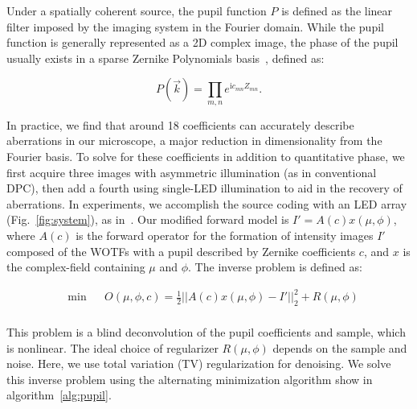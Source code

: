 Under a spatially coherent source, the pupil function $P$ is defined as the linear filter imposed by the imaging system in the Fourier domain. While the pupil function is generally represented as a 2D complex image, the phase of the pupil usually exists in a sparse Zernike Polynomials basis~\cite{ZERNIKE1934689}, defined as:

\begin{equation}
P(\vec{k}) = \prod_{m,n} e^{\mathrm{i}c_{mn} Z_{mn}}.
\end{equation}

In practice, we find that around 18 coefficients can accurately describe aberrations in our microscope, a major reduction in dimensionality from the Fourier basis. To solve for these coefficients in addition to quantitative phase, we first acquire three images with asymmetric illumination (as in conventional DPC), then add a fourth using single-LED illumination to aid in the recovery of aberrations. In experiments, we accomplish the source coding with an LED array (Fig.~\ref{fig:system}), as in~\cite{tian2015quantitative}. Our modified forward model is $I' = A(c) x(\mu,\phi) $, where $A(c)$ is the forward operator for the formation of intensity images $I'$ composed of the WOTFs with a pupil described by Zernike coefficients $c$, and $x$ is the complex-field containing $\mu$ and $\phi$. The inverse problem is defined as:

\begin{equation}
\label{eq:pupilRecoveryObj}
\begin{aligned}
&\text{min}
& & O(\mu,\phi,c) = \frac{1}{2} ||A(c) x(\mu,\phi) - I'||_2^2 + R(\mu,\phi)  \\
\end{aligned}
\end{equation}

This problem is a blind deconvolution of the pupil coefficients and sample, which is nonlinear. The ideal choice of regularizer $R(\mu,\phi)$ depends on the sample and noise. Here, we use total variation (TV) regularization for denoising. We solve this inverse problem using the alternating minimization algorithm show in algorithm~\ref{alg:pupil}.

